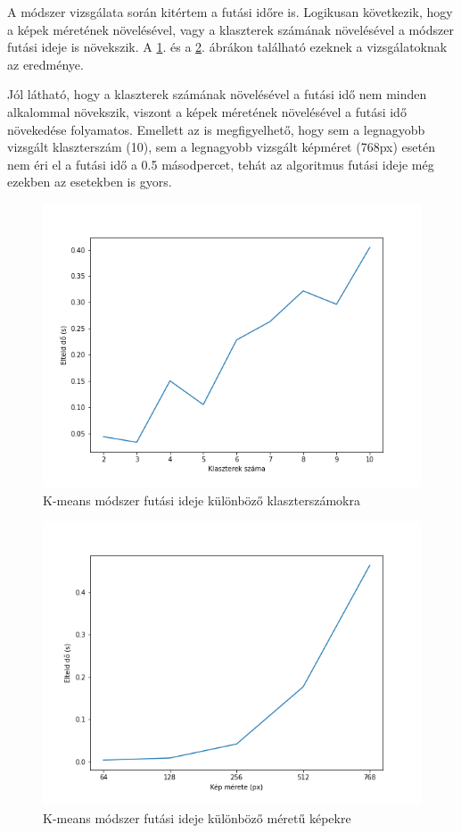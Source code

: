 A módszer vizsgálata során kitértem a futási időre is. Logikusan következik, hogy a képek méretének növelésével, vagy a klaszterek számának növelésével a módszer futási ideje is növekszik. A \ref{fig:kmenas_runtime_cluster}. és a \ref{fig:kmenas_runtime_size}. ábrákon található ezeknek a vizsgálatoknak az eredménye.

Jól látható, hogy a klaszterek számának növelésével a futási idő nem minden alkalommal növekszik, viszont a képek méretének növelésével a futási idő növekedése folyamatos. Emellett az is megfigyelhető, hogy sem a legnagyobb vizsgált klaszterszám (10), sem a legnagyobb vizsgált képméret (768px) esetén nem éri el a futási idő a 0.5 másodpercet, tehát az algoritmus futási ideje még ezekben az esetekben is gyors.

\begin{figure}[h]
\centering
\includegraphics[scale=0.7]{images/kmeans_runtime_cluster.png}
\caption{K-means módszer futási ideje különböző klaszterszámokra}
\label{fig:kmenas_runtime_cluster}
\end{figure}

\begin{figure}[h]
\centering
\includegraphics[scale=0.7]{images/kmeans_runtime_size.png}
\caption{K-means módszer futási ideje különböző méretű képekre}
\label{fig:kmenas_runtime_size}
\end{figure}


